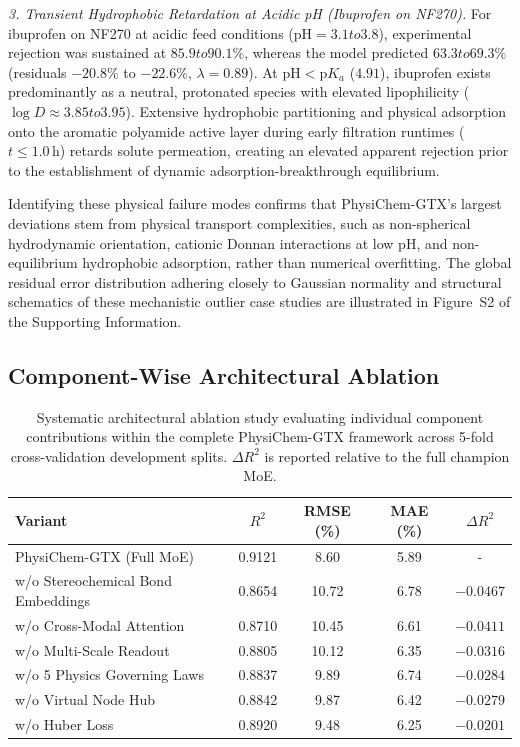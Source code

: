 \documentclass[11pt]{article}
\newcommand{\rsq}{R^{2}}
\begin{document}
\textit{3. Transient Hydrophobic Retardation at Acidic pH (Ibuprofen on NF270).} For ibuprofen on NF270 at acidic feed conditions ($\mathrm{pH} = 3.1 to 3.8$), experimental rejection was sustained at $85.9 to 90.1\%$, whereas the model predicted $63.3 to 69.3\%$ (residuals $-20.8\%$ to $-22.6\%$, $\lambda = 0.89$). At $\mathrm{pH} < \mathrm{p}K_a$ ($4.91$), ibuprofen exists predominantly as a neutral, protonated species with elevated lipophilicity ($\log D \approx 3.85 to 3.95$). Extensive hydrophobic partitioning and physical adsorption onto the aromatic polyamide active layer during early filtration runtimes ($t \leq 1.0\,\mathrm{h}$) retards solute permeation, creating an elevated apparent rejection prior to the establishment of dynamic adsorption-breakthrough equilibrium.

Identifying these physical failure modes confirms that PhysiChem-GTX's largest deviations stem from physical transport complexities, such as non-spherical hydrodynamic orientation, cationic Donnan interactions at low pH, and non-equilibrium hydrophobic adsorption, rather than numerical overfitting. The global residual error distribution adhering closely to Gaussian normality and structural schematics of these mechanistic outlier case studies are illustrated in Figure~S2 of the Supporting Information.

\subsection{Component-Wise Architectural Ablation}
\label{subsec:ablation}

\begin{table}[htbp]
\centering
\caption{Systematic architectural ablation study evaluating individual component contributions within the complete PhysiChem-GTX framework across 5-fold cross-validation development splits. $\Delta \rsq$ is reported relative to the full champion MoE.}
\label{tab:ablation}
\begin{tabular}{lcccc}
\toprule
Variant & $\rsq$ & RMSE (\%) & MAE (\%) & $\Delta \rsq$ \\
\midrule
PhysiChem-GTX (Full MoE) & 0.9121 & 8.60 & 5.89 & - \\
w/o Stereochemical Bond Embeddings & 0.8654 & 10.72 & 6.78 & $-0.0467$ \\
w/o Cross-Modal Attention & 0.8710 & 10.45 & 6.61 & $-0.0411$ \\
w/o Multi-Scale Readout & 0.8805 & 10.12 & 6.35 & $-0.0316$ \\
w/o 5 Physics Governing Laws & 0.8837 & 9.89 & 6.74 & $-0.0284$ \\
w/o Virtual Node Hub & 0.8842 & 9.87 & 6.42 & $-0.0279$ \\
w/o Huber Loss & 0.8920 & 9.48 & 6.25 & $-0.0201$ \\
\bottomrule
\end{tabular}%

\end{table}
\end{document}

